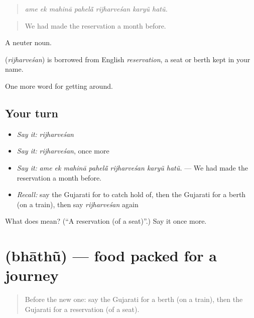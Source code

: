 \begin{quote}
\emph{ame ek mahinā pahelā̃ rijharveśan karyũ hatũ.}
\end{quote}

\begin{quote}
We had made the reservation a month before.
\end{quote}

A neuter noun.

\begin{cousinweb}
\textbf{} (\emph{rijharveśan}) is borrowed from English \emph{reservation}, a seat or berth kept in your name.
\end{cousinweb}

\begin{grammarlens}[title={What you've built}]
One more word for getting around.
\end{grammarlens}

\subsection*{Your turn}
\begin{itemize}
\raggedright
  \item \emph{Say it:} \emph{rijharveśan}
  \item \emph{Say it:} \emph{rijharveśan}, once more
  \item \emph{Say it:} \emph{ame ek mahinā pahelā̃ rijharveśan karyũ hatũ.} — We had made the reservation a month before.
  \item \emph{Recall:} say the Gujarati for to catch hold of, then the Gujarati for a berth (on a train), then say \emph{rijharveśan} again
\end{itemize}

\begin{tcolorbox}[breakable,colback=teal!4,colframe=teal!35!black,title={Before you move on}]
What does  mean? (\textquotedblleft{}A reservation (of a seat)\textquotedblright{}.) Say it once more.
\end{tcolorbox}
\section[\texorpdfstring{\gu{ભાથું} (bhāthũ)}{ભાથું (bhāthũ)}]{ (bhāthũ) — food packed for a journey}

\label{lesson:GU-C395-bhathu}



\begin{quote}
Before the new one: say the Gujarati for a berth (on a train), then the Gujarati for a reservation (of a seat).
\end{quote}

